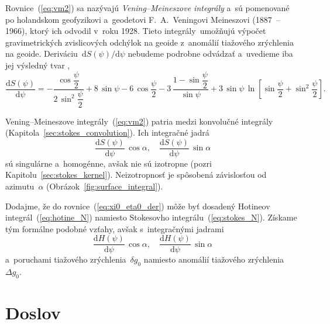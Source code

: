 \documentclass[a4paper, 12pt]{book}
\newcommand{\diff}{\mathrm d}
\begin{document}
Rovnice~(\ref{eq:vm2}) sa nazývajú \emph{Vening--Meineszove integrály} a~sú 
pomenované po holandskom geofyzikovi a~geodetovi F.~A.~Veningovi Meineszovi 
(1887~-- 1966), ktorý ich odvodil v~roku 1928.  Tieto integrály~umožňujú 
výpočet gravimetrických zvislicových odchýlok na geoide z~anomálií tiažového 
zrýchlenia na geoide.  Deriváciu~$\diff S(\psi) \slash \diff\psi$ nebudeme 
podrobne odvádzať a~uvedieme iba jej výsledný tvar
\parencite{MoritzPhysicalGeodesy},
%
\begin{equation}
\frac{\diff S(\psi)}{\diff \psi} = - \frac{\cos\dfrac{\psi}{2}}{2 \, 
\sin^2\dfrac{\psi}{2}} + 8 \, \sin\psi - 6 \, \cos\dfrac{\psi}{2} - 3\, \frac{1 
- \sin\dfrac{\psi}{2}}{\sin\psi} + 3 \, \sin\psi \, \ln \left[ 
\sin\dfrac{\psi}{2} + \sin^2\dfrac{\psi}{2} \right]{.}
\end{equation}

Vening--Meineszove integrály~(\ref{eq:vm2}) patria medzi konvolučné integrály 
(Kapitola~\ref{sec:stokes_convolution}).  Ich integračné jadrá
%
\begin{equation}
\label{eq:vm_kernels}
\frac{\diff S(\psi)}{\diff\psi} \, \cos\alpha{,} \quad \frac{\diff 
S(\psi)}{\diff\psi} \, \sin\alpha
\end{equation}
%
sú singulárne a~homogénne, avšak nie sú izotropne (pozri 
Kapitolu~\ref{sec:stokes_kernel}).  Neizotropnosť je spôsobená závislosťou od 
azimutu~$\alpha$ (Obrázok~\ref{fig:surface_integral}).

Dodajme, že do rovnice~(\ref{eq:xi0_eta0_der}) môže byť dosadený Hotineov 
integrál~(\ref{eq:hotine_N}) namiesto Stokesovho integrálu~(\ref{eq:stokes_N}).  
Získame tým formálne podobné vzťahy, avšak s~integračnými jadrami
%
\begin{equation}
\label{eq:vm_kernels2}
\frac{\diff H(\psi)}{\diff\psi} \, \cos\alpha{,} \quad \frac{\diff 
H(\psi)}{\diff\psi} \, \sin\alpha
\end{equation}
%
a~poruchami tiažového zrýchlenia~$\delta g_0$ namiesto anomálií tiažového 
zrýchlenia~$\Delta g_0$.






\chapter*{Doslov}
\end{document}
